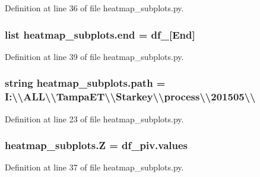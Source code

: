 Definition at line 36 of file heatmap\+\_\+subplots.\+py.

\hypertarget{namespaceheatmap__subplots_a8add050a641ed8526f32e354fffdee93}{}
\subsubsection[{end}]{\setlength{\rightskip}{0pt plus 5cm}list heatmap\+\_\+subplots.\+end = {\bf df\+\_}\mbox{[}\textquotesingle{}End\textquotesingle{}\mbox{]}}\label{namespaceheatmap__subplots_a8add050a641ed8526f32e354fffdee93}


Definition at line 39 of file heatmap\+\_\+subplots.\+py.

\hypertarget{namespaceheatmap__subplots_ab7df7a9753e857e63f1f8b0490859a31}{}
\subsubsection[{path}]{\setlength{\rightskip}{0pt plus 5cm}string heatmap\+\_\+subplots.\+path = \textquotesingle{}I\+:\textbackslash{}\textbackslash{}\+A\+L\+L\textbackslash{}\textbackslash{}\+Tampa\+E\+T\textbackslash{}\textbackslash{}\+Starkey\textbackslash{}\textbackslash{}process\textbackslash{}\textbackslash{}201505\textbackslash{}\textbackslash{}\textquotesingle{}}\label{namespaceheatmap__subplots_ab7df7a9753e857e63f1f8b0490859a31}


Definition at line 23 of file heatmap\+\_\+subplots.\+py.

\hypertarget{namespaceheatmap__subplots_ad2fa7e90b3ea750418e7bfe6c549745f}{}
\subsubsection[{Z}]{\setlength{\rightskip}{0pt plus 5cm}heatmap\+\_\+subplots.\+Z = df\+\_\+piv.\+values}\label{namespaceheatmap__subplots_ad2fa7e90b3ea750418e7bfe6c549745f}


Definition at line 37 of file heatmap\+\_\+subplots.\+py.

